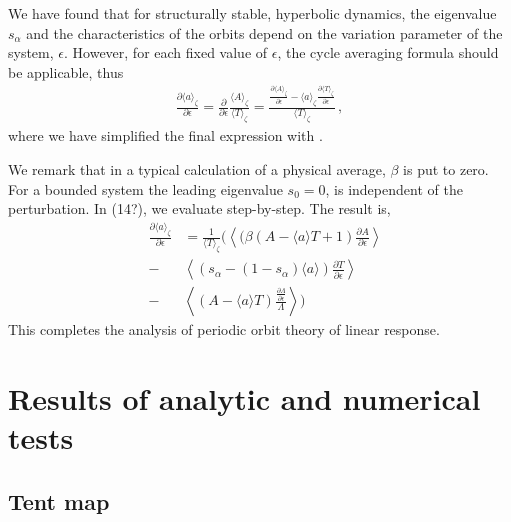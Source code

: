 \documentclass[aps,pre,
                showpacs,
                twocolumn,
                groupedaddress,
                floatfix]{revtex4-1}
\begin{document}
We have found that for structurally stable, hyperbolic dynamics, the
eigenvalue $s_{\alpha}$ and the characteristics of the orbits depend on
the variation parameter of the system, $\epsilon$. However, for each
fixed value of $\epsilon$, the cycle averaging formula should be
applicable, thus
\begin{eqnarray}
\frac{\partial \langle a\rangle_{\zeta}}{\partial \epsilon} = \frac{\partial}{\partial \epsilon}\frac{\langle A \rangle_{\zeta}}{\langle T \rangle_{\zeta}} =
\frac{\frac{\partial \langle A \rangle_{\zeta}}{\partial \epsilon} - \langle a \rangle_{\zeta}\frac{\partial \langle T \rangle_{\zeta}}{\partial \epsilon}}{\langle T \rangle_{\zeta}}
\,,
\label{varObserv}
\end{eqnarray}
where we have simplified the final expression with .

We remark that in a typical calculation of a physical average, $\beta$ is
put to zero. For a bounded system the leading eigenvalue $s_{0}=0$, is
independent of the perturbation. In 
(14?), we evaluate  step-by-step. The result is,
\begin{eqnarray*}
&\frac{\partial \langle a\rangle_{\zeta}}{\partial \epsilon}& = \frac{1}{\langle T \rangle_{\zeta}}\Bigg( \left\langle (\beta(A-\langle a\rangle T + 1)\frac{\partial A}{\partial \epsilon}\right\rangle \\ &-& \left\langle (s_{\alpha}-(1-s_{\alpha})\langle a\rangle)\frac{\partial T}{\partial \epsilon}\right\rangle  \\
&-&\left\langle (A-\langle a \rangle T) \frac{\frac{\partial \Lambda}{\partial \epsilon}}{\Lambda}\right\rangle \Bigg)
\end{eqnarray*}
This completes the analysis of periodic orbit theory of linear response.


\section{Results of analytic and numerical tests}
\label{sect:tests}

\subsection{Tent map}
\label{sect:tentMap}
\end{document}
